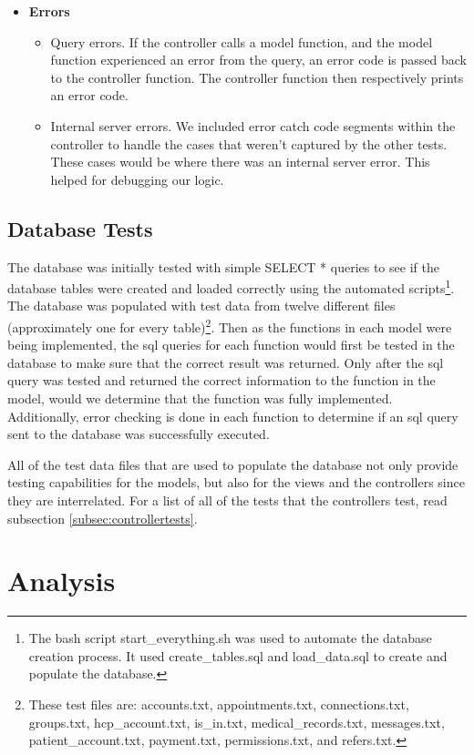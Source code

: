 \begin{itemize}
\begin{itemize}
\end{itemize}
\item \textbf{Errors}
\begin{itemize} 
\item Query errors. If the controller calls a model function, and the model function experienced an error from the query, an error code is passed back to the controller function. The controller function then respectively prints an error code. 
\item Internal server errors. We included error catch code segments within the controller to handle the cases that weren't captured by the other tests. These cases would be where there was an internal server error. This helped for debugging our logic.  
\end{itemize}
\end{itemize}


\section{Database Tests}
The database was initially tested with simple SELECT * queries to see if the database tables were created and loaded correctly using the automated scripts\footnote{The bash script start\_everything.sh was used to automate the database creation process.  It used create\_tables.sql and load\_data.sql to create and populate the database.}. The database was populated with test data from twelve different files (approximately one for every table)\footnote{These test files are: accounts.txt, appointments.txt, connections.txt, groups.txt, hcp\_account.txt, is\_in.txt, medical\_records.txt, messages.txt, patient\_account.txt, payment.txt, permissions.txt, and refers.txt.}.  Then as the functions in each model were being implemented, the sql queries for each function would first be tested in the database to make sure that the correct result was returned.  Only after the sql query was tested and returned the correct information to the function in the model, would we determine that the function was fully implemented.  Additionally, error checking is done in each function to determine if an sql query sent to the database was successfully executed.

All of the test data files that are used to populate the database not only provide testing capabilities for the models, but also for the views and the controllers since they are interrelated.  For a list of all of the tests that the controllers test, read subsection \ref{subsec:controllertests}.



\chapter{Analysis}